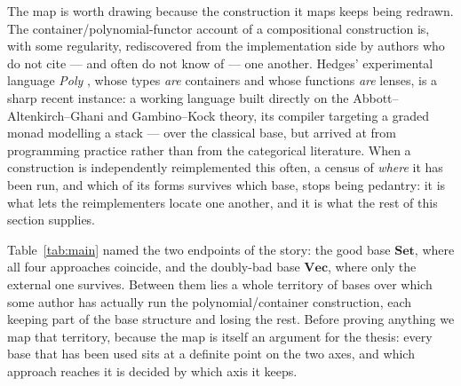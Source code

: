 \documentclass[11pt]{amsart}
\theoremstyle{plain}
\theoremstyle{definition}
\theoremstyle{remark}
\newcommand{\Set}{\mathbf{Set}}
\newcommand{\Vect}{\mathbf{Vec}}
\begin{document}
The map is worth drawing because the construction it maps keeps being redrawn. The
container/polynomial-functor account of a compositional construction is, with some regularity,
rediscovered from the implementation side by authors who do not cite --- and often do not know of
--- one another. Hedges' experimental language \emph{Poly} \cite{HedgesPoly}, whose types \emph{are}
containers and whose functions \emph{are} lenses, is a sharp recent instance: a working language
built directly on the Abbott--Altenkirch--Ghani \cite{AAG} and Gambino--Kock \cite{GambinoKock}
theory, its compiler targeting a graded monad modelling a stack --- over the classical base, but
arrived at from programming practice rather than from the categorical literature. When a construction
is independently reimplemented this often, a census of \emph{where} it has been run, and which of its
forms survives which base, stops being pedantry: it is what lets the reimplementers locate one
another, and it is what the rest of this section supplies.

Table~\ref{tab:main} named the two endpoints of the story: the good base $\Set$, where all four
approaches coincide, and the doubly-bad base $\Vect$, where only the external one survives. Between
them lies a whole territory of bases over which some author has actually run the polynomial/container
construction, each keeping part of the base structure and losing the rest. Before proving anything we
map that territory, because the map is itself an argument for the thesis: every base that has been
used sits at a definite point on the two axes, and which approach reaches it is decided by which axis
it keeps.
\end{document}

